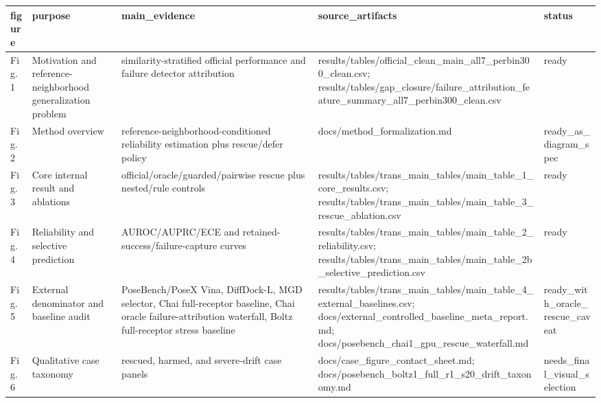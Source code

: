\begin{tabular}{lllll}
\toprule
figure & purpose & main\_evidence & source\_artifacts & status \\
\midrule
Fig. 1 & Motivation and reference-neighborhood generalization problem & similarity-stratified official performance and failure detector attribution & results/tables/official\_clean\_main\_all7\_perbin300\_clean.csv; results/tables/gap\_closure/failure\_attribution\_feature\_summary\_all7\_perbin300\_clean.csv & ready \\
Fig. 2 & Method overview & reference-neighborhood-conditioned reliability estimation plus rescue/defer policy & docs/method\_formalization.md & ready\_as\_diagram\_spec \\
Fig. 3 & Core internal result and ablations & official/oracle/guarded/pairwise rescue plus nested/rule controls & results/tables/trans\_main\_tables/main\_table\_1\_core\_results.csv; results/tables/trans\_main\_tables/main\_table\_3\_rescue\_ablation.csv & ready \\
Fig. 4 & Reliability and selective prediction & AUROC/AUPRC/ECE and retained-success/failure-capture curves & results/tables/trans\_main\_tables/main\_table\_2\_reliability.csv; results/tables/trans\_main\_tables/main\_table\_2b\_selective\_prediction.csv & ready \\
Fig. 5 & External denominator and baseline audit & PoseBench/PoseX Vina, DiffDock-L, MGD selector, Chai full-receptor baseline, Chai oracle failure-attribution waterfall, Boltz full-receptor stress baseline & results/tables/trans\_main\_tables/main\_table\_4\_external\_baselines.csv; docs/external\_controlled\_baseline\_meta\_report.md; docs/posebench\_chai1\_gpu\_rescue\_waterfall.md & ready\_with\_oracle\_rescue\_caveat \\
Fig. 6 & Qualitative case taxonomy & rescued, harmed, and severe-drift case panels & docs/case\_figure\_contact\_sheet.md; docs/posebench\_boltz1\_full\_r1\_s20\_drift\_taxonomy.md & needs\_final\_visual\_selection \\
\bottomrule
\end{tabular}
